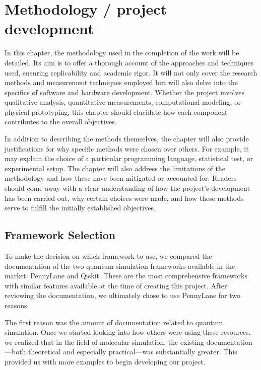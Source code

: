 

\chapter{Methodology / project development}

In this chapter, the methodology used in the completion of the work will be detailed. Its aim is to offer a thorough account of the approaches and techniques used, ensuring replicability and academic rigor. It will not only cover the research methods and measurement techniques employed but will also delve into the specifics of software and hardware development. Whether the project involves qualitative analysis, quantitative measurements, computational modeling, or physical prototyping, this chapter should elucidate how each component contributes to the overall objectives.

In addition to describing the methods themselves, the chapter will also provide justifications for why specific methods were chosen over others. For example, it may explain the choice of a particular programming language, statistical test, or experimental setup. The chapter will also address the limitations of the methodology and how these have been mitigated or accounted for. Readers should come away with a clear understanding of how the project's development has been carried out, why certain choices were made, and how these methods serve to fulfill the initially established objectives.


\section{Framework Selection}
To make the decision on which framework to use, we compared the documentation of the two quantum simulation frameworks available in the market: PennyLane and Qiskit. These are the most comprehensive frameworks with similar features available at the time of creating this project. After reviewing the documentation, we ultimately chose to use PennyLane for two reasons.

The first reason was the amount of documentation related to quantum simulation. Once we started looking into how others were using these resources, we realized that in the field of molecular simulation, the existing documentation—both theoretical and especially practical—was substantially greater. This provided us with more examples to begin developing our project.


